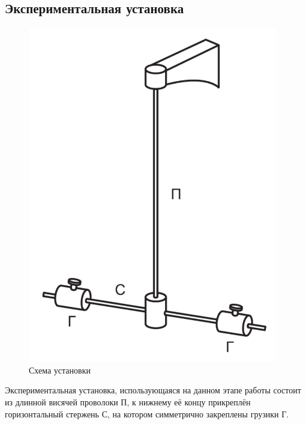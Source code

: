 \documentclass[a4paper, 12pt]{article}
\begin{document}
\subsection{Экспериментальная установка}
\begin{figure}[h]
    \centering
    \includegraphics{dyn.png}
    \caption{Схема установки}
    \label{fig:enter-label}
\end{figure}
Экспериментальная установка, использующаяся на данном этапе работы состоит из длинной висячей проволоки П, к нижнему её концу прикреплён горизонтальный стержень С, на котором симметрично закреплены грузики Г. 
\end{document}
